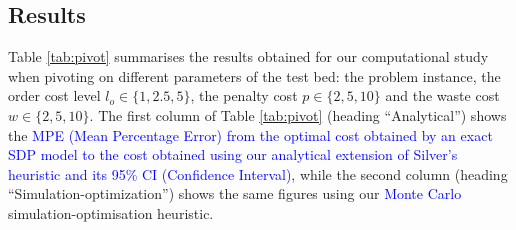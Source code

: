 \documentclass{tPRS2e}
\newcommand{\blue}{\textcolor{blue}}
\begin{document}
\subsection{Results}
\label{sec:results}
Table \ref{tab:pivot} summarises the results obtained for our computational study when pivoting on different parameters of the test bed: the problem instance, the order cost level $l_o \in \{1, 2.5, 5\}$, the penalty cost $p \in \{2, 5, 10\}$ and the waste cost $w \in \{2, 5, 10\}$. The first column of Table \ref{tab:pivot} (heading ``Analytical'') shows the \blue{MPE (Mean Percentage Error) from the optimal cost obtained by an exact SDP model to the cost obtained using our analytical extension of Silver's heuristic and its 95\% CI (Confidence Interval)}, while the second column (heading ``Simulation-optimization'') shows the same figures using our \blue{Monte Carlo} simulation-optimisation heuristic. 
\end{document}
